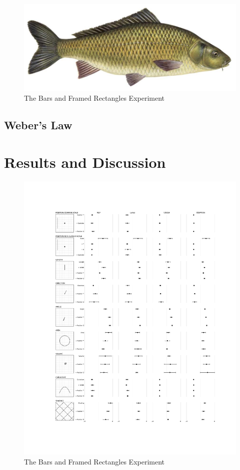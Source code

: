 \documentclass[journal]{vgtc}                %
\begin{document}
\begin{figure}[t]
	  \includegraphics[width=\linewidth]{fish.jpg}
  \caption{The Bars and Framed Rectangles Experiment}
	\label{fig:bars_and_framed_rectangles_experiment}
\end{figure}

\subsection{Weber's Law}

\section{Results and Discussion}

\begin{figure}[t]
	  \includegraphics[width=\linewidth]{figure1.pdf}
  \caption{The Bars and Framed Rectangles Experiment}
	\label{fig:bars_and_framed_rectangles_experiment}
\end{figure}
\end{document}
